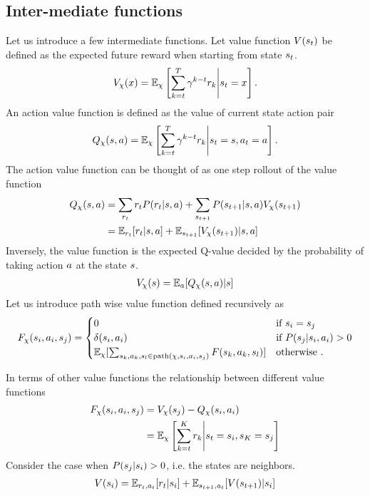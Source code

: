 \subsection{Inter-mediate functions}
Let us introduce a few intermediate functions.
Let value function $V(s_t)$ be defined as the expected
future reward when starting from state $s_t$.
%
\begin{align}
  V_\chi(x) = \mathbb{E}_\chi \left[ \sum_{k=t}^T \gamma^{k-t} r_k \middle|  s_t = x \right].
\end{align}%
%
An action value function is defined as the value of current state action pair
%
\begin{align}
  Q_\chi(s, a) = \mathbb{E}_\chi \left[ \sum_{k=t}^T \gamma^{k-t}
    r_k \middle| s_t = s, a_t = a \right].
\end{align}%
%
The action value function can be thought of as one step rollout of the value function
%
\begin{align}
  Q_\chi(s, a) &= \sum_{r_t} r_t P(r_t | s, a) +
  \sum_{s_{t+1}} P(s_{t+1} | s, a)
  V_\chi(s_{t+1})
  \\
  &= \mathbb{E}_{r_t}[r_t | s, a]
  + \mathbb{E}_{s_{t+1}} [ V_\chi(s_{t+1}) | s, a ]
\end{align}%
%
Inversely, the value function is the expected Q-value decided by the
probability of taking action $a$ at the state $s$.
%
\begin{align}
  V_\chi(s) = \mathbb{E}_{a}[ Q_\chi(s, a) | s ]
\end{align}
%
Let us introduce path wise value function defined recursively as
%
\newcommand{\Floyd}{F}%
\begin{align}
  \Floyd_\policy(\state_i, \act_i, \state_j) = \begin{cases}
    0 &\text{if } \state_i = \state_j
    \\
    \delta(\state_i, \act_i) &\text{if } P(\state_j | \state_i, \act_i) > 0
    \\
    \E_\policy[ \sum_{\state_k, \act_k, \state_l \in \text{path}(\policy, \state_i, \act_i, \state_j)}
        \Floyd(\state_k, \act_k, \state_l) ] & \text{otherwise }.
  \end{cases}
\end{align}%

In terms of other value functions the relationship between different value functions
%
\begin{align}
  \Floyd_\policy(\state_i, \act_i, \state_j) &= \Value_\policy(\state_j) - Q_\policy(\state_i, \act_i)
  \\
  &=
  \E_\policy\left[
    \sum_{k=t}^{K} \rew_k \middle| \state_t = \state_i, \state_K = \state_j \right]
\end{align}%
%
Consider the case when $P(s_j | s_i) > 0$, i.e. the states are neighbors.
%
\begin{align}
  V(s_i) = \mathbb{E}_{r_t, a_t}[ r_t | s_i ]
  + \mathbb{E}_{s_{t+1}, a_t}[ V(s_{t+1}) | s_i]
\end{align}



